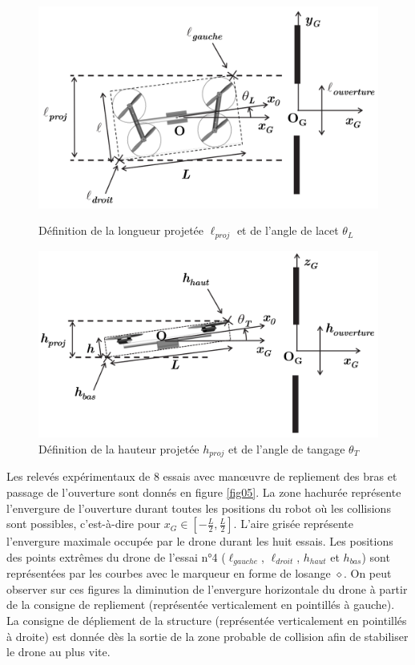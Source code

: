 \begin{figure}[ht!]
\begin{minipage}[t]{0.49\linewidth}
\begin{center}
 \includegraphics[width=0.95\linewidth]{img/fig03}
\end{center}
\caption{\label{fig03} Définition de la longueur projetée
$\ell_{proj}$ et de l'angle de lacet $\theta_L$}
\end{minipage}\hfill
\begin{minipage}[t]{0.49\linewidth}
\begin{center}
 \includegraphics[width=0.95\linewidth]{img/fig04}
\end{center}
\caption{\label{fig04} Définition de la hauteur projetée
$h_{proj}$ et de l'angle de tangage $\theta_T$}
\end{minipage}
\end{figure}

Les relevés expérimentaux de 8 essais avec man\oe uvre de repliement des bras et passage de l'ouverture sont donnés en figure \ref{fig05}. La zone hachurée représente l'envergure de l'ou­verture durant toutes les positions du robot où les collisions sont possibles, c'est­-à-­dire pour $x_G \in \left[-\frac{L}{2}, \frac{L}{2}\right]$. L'aire grisée représente l'envergure maximale occupée par le drone du­rant les huit essais. Les positions des points extrêmes du drone de l'essai n°4 ($\ell_{gauche}$, $\ell_{droit}$, $h_{haut}$ et $h_{bas}$) sont représentées par les courbes avec le marqueur en forme de losange $\diamond$. On peut observer sur ces figures la diminution de l'envergure horizontale du drone à partir de la consigne de repliement (représentée verticalement en pointillés à gauche). La consigne de dépliement de la structure (représentée verticalement en pointillés à droite) est donnée dès la sortie de la zone probable de collision afin de stabiliser le drone au plus vite.


